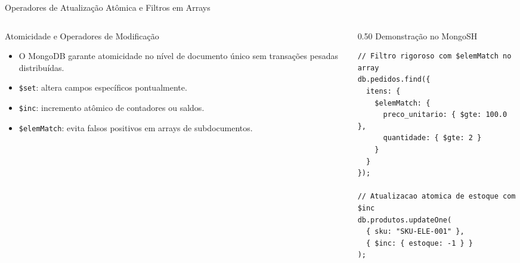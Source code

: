 \begin{frame}[fragile]{Operadores de Atualização Atômica e Filtros em Arrays}
  \vspace{0.1cm}
  \begin{columns}[t,onlytextwidth]
    \begin{column}{0.48\textwidth}
      \alert{Atomicidade e Operadores de Modificação}\par
      \footnotesize
      \begin{itemize}
        \item O MongoDB garante atomicidade no nível de documento único sem transações pesadas distribuídas.
        \item \lstinline[language=mongosh, basicstyle=\footnotesize\ttfamily]|$set|: altera campos específicos pontualmente.
        \item \lstinline[language=mongosh, basicstyle=\footnotesize\ttfamily]|$inc|: incremento atômico de contadores ou saldos.
        \item \lstinline[language=mongosh, basicstyle=\footnotesize\ttfamily]|$elemMatch|: evita falsos positivos em arrays de subdocumentos.
      \end{itemize}
    \end{column}
    
    \begin{column}{0.50\textwidth}
      \alert{Demonstração no MongoSH}\par
      \vspace{0.05cm}
      \begin{lstlisting}[language=mongosh]
// Filtro rigoroso com $elemMatch no array
db.pedidos.find({
  itens: {
    $elemMatch: {
      preco_unitario: { $gte: 100.0 },
      quantidade: { $gte: 2 }
    }
  }
});

// Atualizacao atomica de estoque com $inc
db.produtos.updateOne(
  { sku: "SKU-ELE-001" },
  { $inc: { estoque: -1 } }
);
      \end{lstlisting}
    \end{column}
  \end{columns}
\end{frame}

